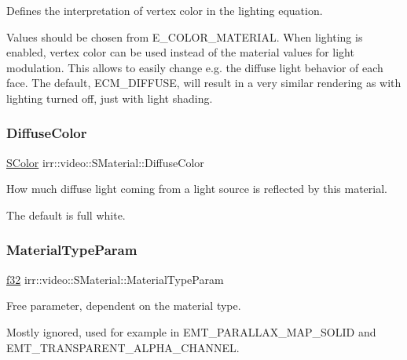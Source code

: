 Defines the interpretation of vertex color in the lighting equation. 

Values should be chosen from E\+\_\+\+C\+O\+L\+O\+R\+\_\+\+M\+A\+T\+E\+R\+I\+AL. When lighting is enabled, vertex color can be used instead of the material values for light modulation. This allows to easily change e.\+g. the diffuse light behavior of each face. The default, E\+C\+M\+\_\+\+D\+I\+F\+F\+U\+SE, will result in a very similar rendering as with lighting turned off, just with light shading. \mbox{\label{classirr_1_1video_1_1SMaterial_ac4e1aaf4751f7267eaf255496cc058df}} 
\subsubsection{\texorpdfstring{Diffuse\+Color}{DiffuseColor}}
{\footnotesize\ttfamily \hyperlink{classirr_1_1video_1_1SColor}{S\+Color} irr\+::video\+::\+S\+Material\+::\+Diffuse\+Color}



How much diffuse light coming from a light source is reflected by this material. 

The default is full white. \mbox{\label{classirr_1_1video_1_1SMaterial_aefe0acce491efa8dedcd2b7cb49f8133}} 
\subsubsection{\texorpdfstring{Material\+Type\+Param}{MaterialTypeParam}}
{\footnotesize\ttfamily \hyperlink{namespaceirr_a0277be98d67dc26ff93b1a6a1d086b07}{f32} irr\+::video\+::\+S\+Material\+::\+Material\+Type\+Param}



Free parameter, dependent on the material type. 

Mostly ignored, used for example in E\+M\+T\+\_\+\+P\+A\+R\+A\+L\+L\+A\+X\+\_\+\+M\+A\+P\+\_\+\+S\+O\+L\+ID and E\+M\+T\+\_\+\+T\+R\+A\+N\+S\+P\+A\+R\+E\+N\+T\+\_\+\+A\+L\+P\+H\+A\+\_\+\+C\+H\+A\+N\+N\+EL. \mbox{\label{classirr_1_1video_1_1SMaterial_a3c4af8e0325a95ff78c3066a497161de}} 
